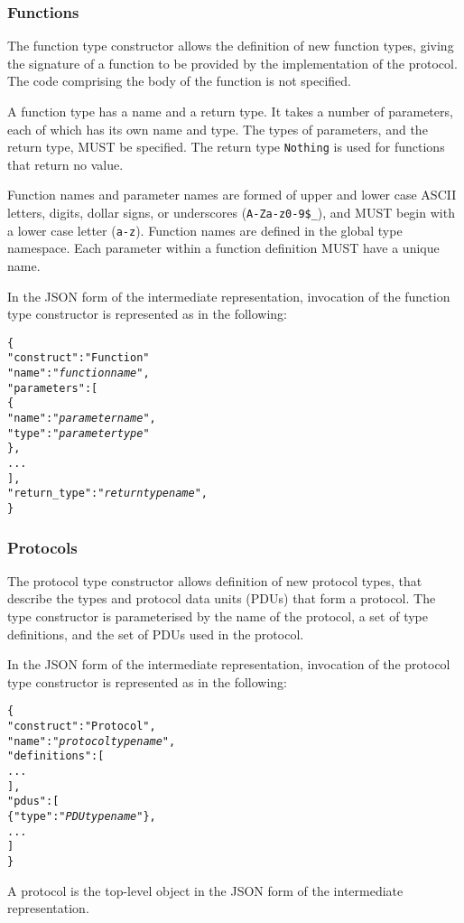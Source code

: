 \documentclass[10pt,twocolumn,a4paper]{article}
\newcommand{\code}[1]{\texttt{#1}}
\begin{document}
\subsubsection{Functions}
\label{sec:functions}

The function type constructor allows the definition of new function types,
giving the signature of a function to be provided by the implementation of
the protocol. The code comprising the body of the function is not specified. 

A function type has a name and a return type. It takes a number of
parameters, each of which has its own name and type. 
The types of parameters, and the return type, MUST be specified.
The return type \code{Nothing} is used for functions that return no value.

Function names and parameter names are formed of upper and lower case ASCII
letters, digits, dollar signs, or underscores (\code{A-Za-z0-9\$\_}), and
MUST begin with a lower case letter (\code{a-z}).
Function names are defined in the global type namespace.
Each parameter within a function definition MUST have a unique name.

In the JSON form of the intermediate representation, invocation of the
function type constructor is represented as in the following:
\footnotesize
\begin{alltt}
  \{
    "construct"    : "Function"
    "name"         : "\emph{function name}",
    "parameters"   : [
      \{
        "name" : "\emph{parameter name}",
        "type" : "\emph{parameter type}"
      \},
      ...
    ],
    "return\_type"  : "\emph{return type name}",
  \}
\end{alltt}
\normalsize

\subsubsection{Protocols}

The protocol type constructor allows definition of new protocol types, that
describe the types and protocol data units (PDUs) that form a protocol. The
type constructor is parameterised by the name of the protocol, a set of
type definitions, and the set of PDUs used in the protocol.

In the JSON form of the intermediate representation, invocation of the
protocol type constructor is represented as in the following:
\footnotesize
\begin{alltt}
  \{
    "construct"   : "Protocol",
    "name"        : "\emph{protocol type name}",
    "definitions" : [
                      ...
                    ],
    "pdus"        : [
      \{"type" : "\emph{PDU type name}"\},
      ...
    ]
  \}
\end{alltt}
\normalsize
A protocol is the top-level object in the JSON form of the intermediate
representation.
\end{document}
